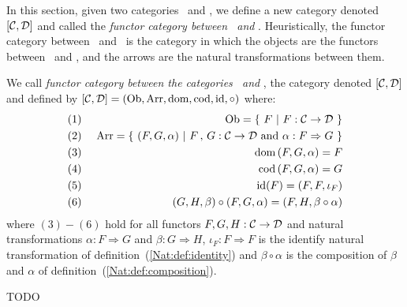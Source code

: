 In this section, given two categories \Cat\ and \Dat, we define a new 
category denoted $[\mbox{$\cal C$},\mbox{$\cal D$}]$ and called the {\em functor category between
\Cat\ and \Dat}. Heuristically, the functor category between \Cat\ and \Dat\
is the category in which the objects are the functors between \Cat\ and \Dat,
and the arrows are the natural transformations between them.
\begin{defin}\label{Nat:def:functor:category}
    We call {\em functor category between the categories \Cat\ and \Dat}, 
    the category denoted $[\mbox{$\cal C$},\mbox{$\cal D$}]$ and  defined by 
    $[\mbox{$\cal C$},\mbox{$\cal D$}]=(\mbox{\rm Ob},\mbox{\rm Arr},\mbox{\rm dom},\mbox{\rm cod},\mbox{\rm id},\circ)$ where:
        \begin{eqnarray*}
            (1)&\ &\ob=\{\ F\ |\ F:\Cat\to\Dat\ \}\\
            (2)&\ &\arr=\{\ (F,G,\alpha)\ |\ F\,,\,G:\Cat\to\Dat\ 
            \mbox{and}\ \alpha:F\Rightarrow G\ \}\\
            (3)&\ &\dom\,(F,G,\alpha)=F\\
            (4)&\ &\cod\,(F,G,\alpha)=G\\
            (5)&\ &\id(F)=(F,F,\iota_{F})\\
            (6)&\ &(G,H,\beta)\circ(F,G,\alpha)=(F,H,\beta\circ\alpha)
        \end{eqnarray*}
    where $(3)-(6)$ hold for all functors $F,G,H:\mbox{$\cal C$}\to\mbox{$\cal D$}$ and natural
    transformations $\alpha:F\Rightarrow G$ and $\beta:G\Rightarrow H$,
    $\iota_{F}:F\Rightarrow F$ is the identify natural transformation 
    of definition~(\ref{Nat:def:identity}) and $\beta\circ\alpha$ is the
    composition of $\beta$ and $\alpha$ of definition~(\ref{Nat:def:composition}).
\end{defin}

TODO
